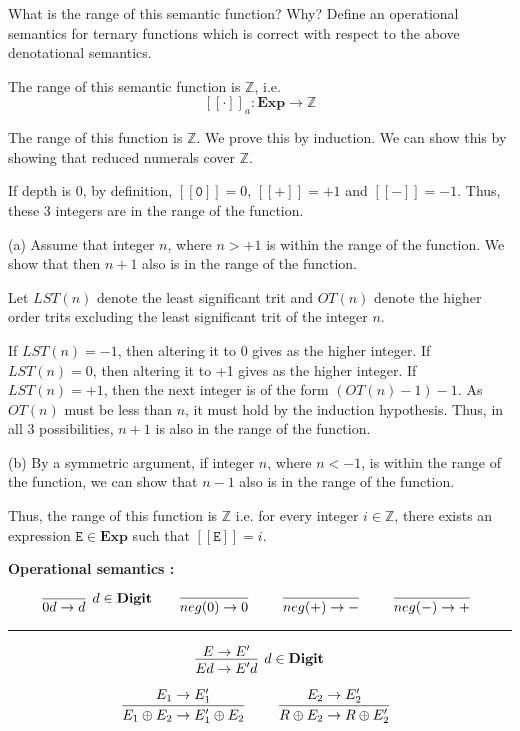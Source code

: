\documentclass[a4paper,10pt]{article}
\newcommand{\E}{\mathtt{E}}
\newcommand{\Digit}{\mathbf{Digit}}
\newcommand{\denot}[1]{\mathtt{[[{#1}]]}}
\begin{document}
\begin{enumerate}
{What is the range of this semantic function? Why? Define an operational semantics for 
ternary functions which is correct with respect to the above denotational semantics.
}

The range of this semantic function is $\mathbb{Z}$, i.e.
$$\denot{\cdot}_a : \textbf{Exp} \rightarrow \mathbb{Z}$$

The range of this function is $\mathbb{Z}$. We prove this by induction.
We can show this by showing that reduced numerals cover $\mathbb{Z}$.

If depth is 0, by definition, $\denot{0} = 0$, $\denot{+} = +1$ and
$\denot{-} = -1$. Thus, these 3 integers are in the range of the function.

(a) Assume that integer $n$, where $n > +1$ is within the range of the function.
We show that then $n+1$ also is in the range of the function. 

Let $LST(n)$ denote the least significant trit and $OT(n)$ denote the
higher order trits excluding the least significant trit of the integer $n$.

If $LST(n) = -1$, then altering it to 0 gives as the higher integer. 
If $LST(n) = 0$, then altering it to +1 gives as the higher integer. 
If $LST(n) = +1$, then the next integer is of the form $(OT(n)-1)-1$.
As $OT(n)$ must be less than $n$, it must hold by the induction hypothesis.
Thus, in all 3 possibilities, $n+1$ is also in the range of the function.

(b) By a symmetric argument, if integer $n$, where $n < -1$, is 
within the range of the function, we can show that $n-1$ also is in the range of
the function.

Thus, the range of this function is $\mathbb{Z}$ i.e. for every integer 
$i \in \mathbb{Z}$, there exists an expression $\E \in \textbf{Exp}$ such that
$\denot{\E} = i$.

\vspace{0.2in}
\textbf{Operational semantics :}
\vspace{0.2in}

\[
\infer[d \in \Digit]
  {0d \rightarrow d}
  {}   
\qquad
\infer[] 
  {neg(0) \rightarrow 0}  
  {}    
\qquad
\infer[] 
  {neg(+) \rightarrow -}  
  {}    
\qquad
\infer[] 
  {neg(-) \rightarrow +}  
  {}    
\]

\hrule

\[
\infer[d \in \Digit]
  {Ed \rightarrow E'd}
  {E \rightarrow E'}
\]

\[
\infer[]
  {E_{1} \oplus E_{2} \rightarrow E_{1}' \oplus E_{2}}
  {E_{1} \rightarrow E_{1}'} 
\qquad
\infer[]
  {R \oplus E_{2} \rightarrow R \oplus E_{2}'}
  {E_{2} \rightarrow E_{2}'}
\]


\end{enumerate}
\end{document}
